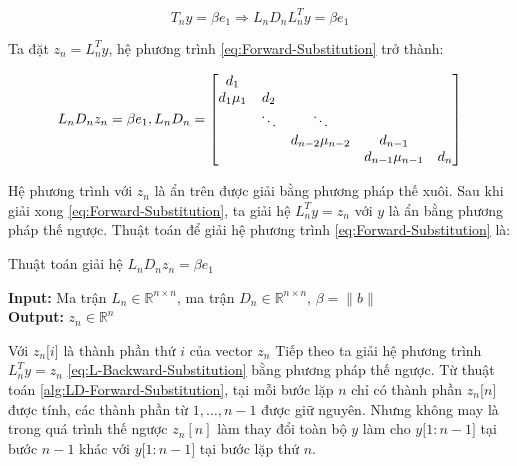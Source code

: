 \documentclass[14pt, a4paper]{article}
\numberwithin{equation}{section}
\numberwithin{algorithm}{section}
\numberwithin{figure}{section}
\numberwithin{dl}{section}
\numberwithin{md}{section}
\numberwithin{bd}{section}
\numberwithin{dn}{section}
\numberwithin{hq}{section}
\begin{document}
\begin{equation} \label{eq:Forward-Substitution}
    T_n y = \beta e_1 \Rightarrow L_n D_n L_n^T y = \beta e_1
\end{equation}

Ta đặt $z_n = L_n^T y$, hệ phương trình \ref{eq:Forward-Substitution} trở thành:

\begin{equation}
    L_n D_n z_n = \beta e_1, L_n D_n = \begin{bmatrix} d_1 & \thickspace & \thickspace & \thickspace & \thickspace \\
        d_1\mu_1 & d_2 & \thickspace & \thickspace & \thickspace \\
        \thickspace & \ddots & \ddots & \thickspace & \thickspace \\
        \thickspace & \thickspace & d_{n-2}\mu_{n-2} & d_{n-1} & \thickspace \\
        \thickspace & \thickspace & \thickspace & d_{n-1}\mu_{n-1} & d_n \end{bmatrix}
\end{equation}

Hệ phương trình với $z_n$ là ẩn trên được giải bằng phương pháp thế xuôi. Sau khi giải xong \ref{eq:Forward-Substitution}, ta giải hệ $L_n^T y = z_n$ với $y$ là ẩn bằng phương pháp thế ngược.
Thuật toán để giải hệ phương trình \ref{eq:Forward-Substitution} là:

\begin{algorithm}[h!]
    \caption{Thuật toán giải hệ $L_n D_n z_n = \beta e_1$} \label{alg:LD-Forward-Substitution}
    \hspace*{\algorithmicindent} \textbf{Input:} {Ma trận $L_n \in \mathbb{R}^{n \times n}$, ma trận $D_n \in \mathbb{R}^{n \times n}$, $\beta = \lVert b \rVert$} \\
    \hspace*{\algorithmicindent} \textbf{Output:} {$z_n \in \mathbb{R}^n$}
    \begin{algorithmic}
        \EndFor
    \end{algorithmic}
\end{algorithm}

Với $z_n\lbrack i \rbrack$ là thành phần thứ $i$ của vector $z_n$
Tiếp theo ta giải hệ phương trình $L_n^T y = z_n$ \ref{eq:L-Backward-Substitution} bằng phương pháp thế ngược. Từ thuật toán \ref{alg:LD-Forward-Substitution}, tại mỗi bước lặp $n$ chỉ có thành phần $z_n\lbrack n \rbrack$ được tính, các thành phần từ $1, \dots, n-1$ được giữ nguyên. Nhưng không may là trong quá trình thế ngược $z_n[n]$ làm thay đổi toàn bộ $y$ làm cho $y\lbrack 1:n-1 \rbrack$ tại bước $n-1$ khác với $y \lbrack 1:n-1 \rbrack$ tại bước lặp thứ $n$.
\end{document}
